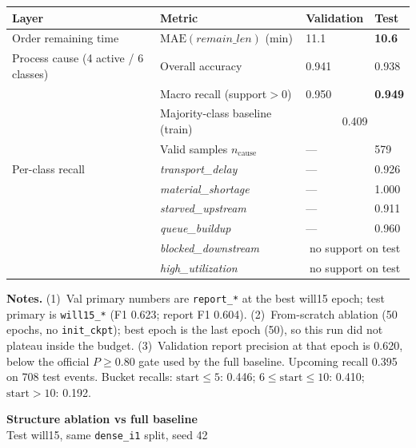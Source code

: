 \documentclass[10pt,a4paper]{article}
\begin{document}
\begin{center}
\begin{tabular}{l l l l}
\toprule
Layer & Metric & Validation & Test \\
\midrule
Order remaining time
  & $\mathrm{MAE}(\textit{remain\_len})$ (min)
  & 11.1
  & \textbf{10.6} \\
\midrule
Process cause (4 active / 6 classes)
  & Overall accuracy
  & 0.941
  & 0.938 \\
  & Macro recall (support${>}0$)
  & 0.950
  & \textbf{0.949} \\
  & Majority-class baseline (train)
  & \multicolumn{2}{c}{0.409} \\
  & Valid samples $n_{\mathrm{cause}}$
  & ---
  & 579 \\
\midrule
Per-class recall
  & \textit{transport\_delay}
  & --- & 0.926 \\
  & \textit{material\_shortage}
  & --- & 1.000 \\
  & \textit{starved\_upstream}
  & --- & 0.911 \\
  & \textit{queue\_buildup}
  & --- & 0.960 \\
  & \textit{blocked\_downstream}
  & \multicolumn{2}{c}{no support on test} \\
  & \textit{high\_utilization}
  & \multicolumn{2}{c}{no support on test} \\
\bottomrule
\end{tabular}
\end{center}

\small
\textbf{Notes.}
(1)~Val primary numbers are \texttt{report\_*} at the best will15 epoch; test primary is \texttt{will15\_*} (F1 0.623; report F1 0.604).
(2)~From-scratch ablation (50 epochs, no \texttt{init\_ckpt}); best epoch is the last epoch (50), so this run did not plateau inside the budget.
(3)~Validation report precision at that epoch is 0.620, below the official $P\ge 0.80$ gate used by the full baseline. Upcoming recall 0.395 on 708 test events. Bucket recalls: $\mathrm{start}\le5$: 0.446; $6\le\mathrm{start}\le10$: 0.410; $\mathrm{start}{>}10$: 0.192.

\clearpage
\begin{center}
{\LARGE\bfseries Structure ablation vs full baseline}\\[3pt]
{\large Test will15, same \texttt{dense\_i1} split, seed 42}
\end{center}
\end{document}
